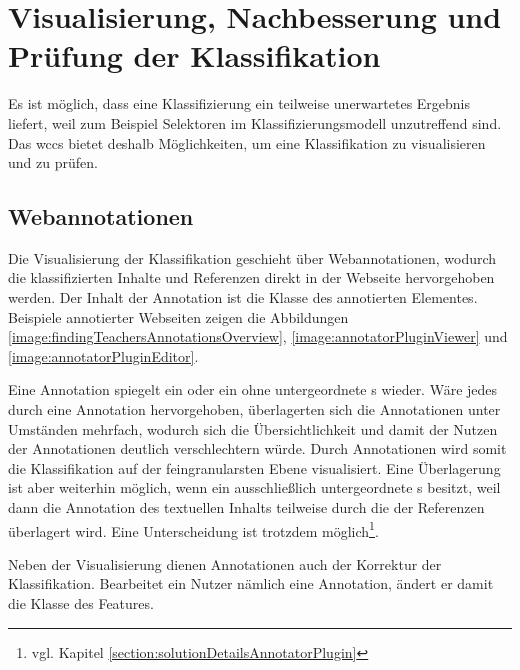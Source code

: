 \section{Visualisierung, Nachbesserung und Prüfung der Klassifikation}
    \label{section:conceptVisualization}
    Es ist möglich, dass eine Klassifizierung ein teilweise unerwartetes Ergebnis liefert,
    weil zum Beispiel Selektoren im Klassifizierungsmodell unzutreffend sind.
    Das \gls{wccs} bietet deshalb Möglichkeiten,
    um eine Klassifikation zu visualisieren und zu prüfen.

    \subsection{Webannotationen}
        \label{section:conceptWebAnnotations}
        Die Visualisierung der Klassifikation geschieht über Webannotationen,
        wodurch die klassifizierten Inhalte und Referenzen direkt in der Webseite hervorgehoben werden.
        Der Inhalt der Annotation ist die Klasse des annotierten Elementes.
        Beispiele annotierter Webseiten zeigen die Abbildungen
        \ref{image:findingTeachersAnnotationsOverview},
        \ref{image:annotatorPluginViewer} und \ref{image:annotatorPluginEditor}.

        Eine Annotation spiegelt ein {} oder ein
        {\contentFeature} ohne untergeordnete {\contentFeature}s wieder.
        Wäre jedes {\contentFeature} durch eine Annotation hervorgehoben,
        überlagerten sich die Annotationen unter Umständen mehrfach,
        wodurch sich die Übersichtlichkeit
        und damit der Nutzen der Annotationen deutlich verschlechtern würde.
        Durch Annotationen wird somit die Klassifikation auf der feingranularsten Ebene visualisiert.
        Eine Überlagerung ist aber weiterhin möglich,
        wenn ein {\contentFeature} ausschließlich untergeordnete {}s besitzt,
        weil dann die Annotation des textuellen Inhalts teilweise durch die
        der Referenzen überlagert wird.
        Eine Unterscheidung ist trotzdem möglich\footnote{vgl. Kapitel \ref{section:solutionDetailsAnnotatorPlugin}}.
        
        Neben der Visualisierung dienen Annotationen auch der Korrektur der Klassifikation.
        Bearbeitet ein Nutzer nämlich eine Annotation,
        ändert er damit die Klasse des Features.

